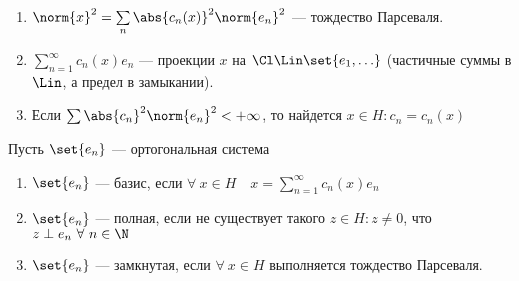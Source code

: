 \begin{observation}
    \begin{enumerate}
        \item $\norm{x}^2 = \sum\limits_n \abs{c_n(x)}^2 \norm{e_n}^2$ --- тождество Парсеваля.
        \item $\sum\limits_{n=1}^\infty c_n(x) e_n$ --- проекции $x$ на $\Cl \Lin \set{e_1, \ldots}$ (частичные суммы в $\Lin$, а предел в замыкании).
        \item Если $\sum \abs{c_n}^2 \norm{e_n}^2 < +\infty$, то найдется $x \in H: c_n = c_n(x)$
    \end{enumerate}
\end{observation}

\begin{definition}
    Пусть $\set{e_n}$ --- ортогональная система
    \begin{enumerate}
        \item $\set{e_n}$ --- базис, если $\forall\ x \in H\quad x = \sum\limits_{n=1}^\infty c_n(x) e_n$
        \item $\set{e_n}$ --- полная, если не существует такого $z \in H: z \neq 0$, что $z \perp e_n\ \forall\ n \in \N$
        \item $\set{e_n}$ --- замкнутая, если $\forall\ x \in H$ выполняется тождество Парсеваля.
    \end{enumerate}
\end{definition}


